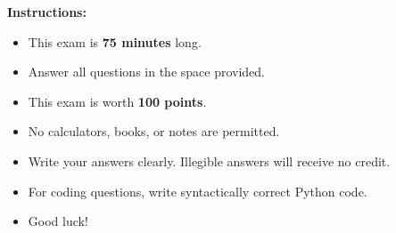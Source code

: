 \documentclass{csexam}
\begin{document}
\maketitle
\printanswers

\begin{rules}
\textbf{Instructions:}
\begin{itemize}
    \item This exam is \textbf{75 minutes} long.
    \item Answer all questions in the space provided.
    \item This exam is worth \textbf{100 points}.
    \item No calculators, books, or notes are permitted.
    \item Write your answers clearly. Illegible answers will receive no credit.
    \item For coding questions, write syntactically correct Python code.
    \item Good luck!
\end{itemize}
\end{rules}

\vspace{5mm}

\showgrade

\newpage
\end{document}
